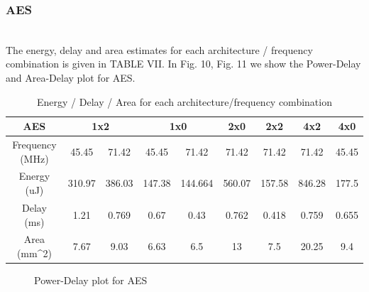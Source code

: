 

\subsubsection{AES}
\\
The energy, delay and area estimates for each architecture / frequency combination is given in TABLE VII.
In Fig. 10, Fig. 11 we show the Power-Delay and Area-Delay plot for AES.

\begin{table}[h!]
\caption{Energy / Delay / Area for each architecture/frequency combination}
\begin{center}
{\begin{tabular}{c | c c c c c c c c}
\hline
AES &\multicolumn{2}{c}{1x2} &\multicolumn{2}{c}{1x0} &2x0 &2x2 &4x2 &4x0 \\ [1ex]
\hline
Frequency (MHz)& 45.45&71.42 & 45.45& 71.42& 71.42& 71.42& 71.42& 45.45 \\ [1ex]
Energy (uJ) &310.97 & 386.03 &147.38 & 144.664 &560.07 &157.58 &846.28 &177.5 \\ [1ex]

Delay (ms)& 1.21& 0.769& 0.67 & 0.43& 0.762& 0.418& 0.759& 0.655\\[1ex] 
Area (mm^2)& 7.67 & 9.03& 6.63 & 6.5 & 13& 7.5& 20.25& 9.4\\[1ex]
\hline
\end{tabular}}
\label{diffstruc}
\end{center}
\end{table}


\begin{figure}[h!]
{\centering {} \par}
\caption{Power-Delay plot for AES}
\end{figure}

